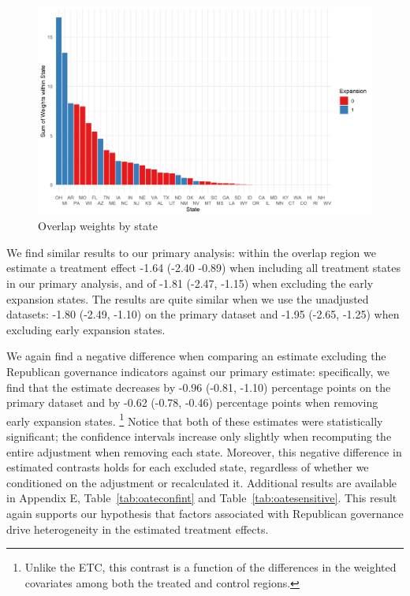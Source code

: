 \documentclass[aoas]{imsart}
\theoremstyle{plain}
\theoremstyle{remark}
\begin{document}
\begin{figure}
\begin{center}
    \caption{Overlap weights by state}
    \label{oatearea}
    \includegraphics[scale=0.6]{01_Plots/oate-region-c1-a.png}
\end{center}
\end{figure}

We find similar results to our primary analysis: within the overlap region we estimate a treatment effect -1.64 (-2.40 -0.89) when including all treatment states in our primary analysis, and of -1.81 (-2.47, -1.15) when excluding the early expansion states. The results are quite similar when we use the unadjusted datasets: -1.80 (-2.49, -1.10) on the primary dataset and -1.95 (-2.65, -1.25) when excluding early expansion states. 

We again find a negative difference when comparing an estimate excluding the Republican governance indicators against our primary estimate: specifically, we find that the estimate decreases by -0.96 (-0.81, -1.10) percentage points on the primary dataset and by -0.62 (-0.78, -0.46) percentage points when removing early expansion states. \footnote{Unlike the ETC, this contrast is a function of the differences in the weighted covariates among both the treated and control regions.} Notice that both of these estimates were statistically significant; the confidence intervals increase only slightly when recomputing the entire adjustment when removing each state. Moreover, this negative difference in estimated contrasts holds for each excluded state, regardless of whether we conditioned on the adjustment or recalculated it. Additional results are available in Appendix E, Table~\ref{tab:oateconfint} and Table~\ref{tab:oatesensitive}. This result again supports our hypothesis that factors associated with Republican governance drive heterogeneity in the estimated treatment effects.
\end{document}
